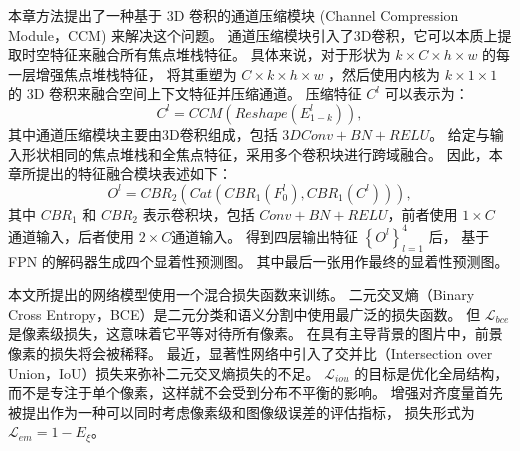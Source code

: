 本章方法提出了一种基于 3D 卷积的通道压缩模块 (Channel Compression Module，CCM) 来解决这个问题。 
通道压缩模块引入了3D卷积，它可以本质上提取时空特征来融合所有焦点堆栈特征。
具体来说，对于形状为 $ k \times C \times h \times w $ 的每一层增强焦点堆栈特征，
将其重塑为 $ C \times  k \times  h \times w $ ，然后使用内核为 $ k \times 1 \times 1 $  的 3D 卷积来融合空间上下文特征并压缩通道。 压缩特征 $ C^{l} $ 可以表示为：
%
%
\begin{equation}
	C^{l} = CCM \left ( Reshape \left ( E_{1-k}^{l} \right ) \right ) ,
\end{equation}
%
%
其中通道压缩模块主要由3D卷积组成，包括 $3DConv+BN+RELU$。 给定与输入形状相同的焦点堆栈和全焦点特征，采用多个卷积块进行跨域融合。 因此，本章所提出的特征融合模块表述如下：
%
%
%	
\begin{equation}
	O^{l}=CBR_{2}\left (Cat \left (CBR_{1} \left (F_{0}^{l} \right ),CBR_{1} \left (C^{l} \right ) \right ) \right ),
\end{equation}
%
%
其中 $CBR_{1}$ 和 $CBR_{2}$ 表示卷积块，包括 $Conv+BN+RELU$，前者使用 $1 \times C$ 通道输入，后者使用 $2 \times C$通道输入。
得到四层输出特征 $\left \{ O^{l} \right \}_{l=1}^{4} $ 后， 基于 FPN 的解码器生成四个显着性预测图。 
其中最后一张用作最终的显着性预测图。 
%
%
%
%
%










本文所提出的网络模型使用一个混合损失函数来训练。
二元交叉熵（Binary Cross Entropy，BCE）是二元分类和语义分割中使用最广泛的损失函数。 但 $\mathcal L_{bce} $ 是像素级损失，这意味着它平等对待所有像素。
在具有主导背景的图片中，前景像素的损失将会被稀释。 最近，显著性网络中引入了交并比（Intersection over Union，IoU）损失来弥补二元交叉熵损失的不足。
$ \mathcal L_{iou} $ 的目标是优化全局结构，而不是专注于单个像素，这样就不会受到分布不平衡的影响。 增强对齐度量首先被提出作为一种可以同时考虑像素级和图像级误差的评估指标，
损失形式为 $ \mathcal L_{em} = 1 - E_{\xi} $。 


